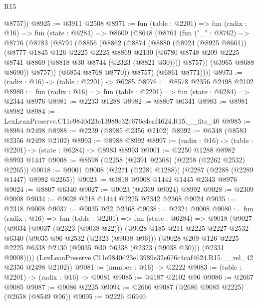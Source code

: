 \begin{lexlean}{R15}
\begin{coremodule}
        @8757))
@8925 := @3911 @2508
@8971 := fun (table : @2201) =>
  fun (radix : @16) =>
  fun (state : @6284) =>
  @8609
    (@8648
      (@8761
        (fun ("_" : @8762) =>
        @8776
          (@8783
            (@8794
              (@8856
                (@8862
                  (@8874
                    (@8880
                      (@8924 (@8925 @8661))
                      (@8777
                        @1845
                        @126
                        @2225
                        @2225
                        @8869
                        @2130
                        (@6780 @8748 @209 @2225 @8741 @8869 (@8818 @30 @8744 (@2323 (@8821 @30))))
                        @8757))
                    (@3965 @8688 @8690))
                  @8757))
              (@6854 @8768 @8770))
            @8757)
          (@6861 @8771))))
@8973 := (radix : @16) -> (table : @2201) -> @6285
@8976 := @8578 @2356 @2498 @2102
@8980 := fun (radix : @16) => fun (table : @2201) => fun (state : @6284) => @2344 @8976
@8981 := @2233 @1288
@8982 := @8807 @6341
@8983 := @8981 @8982
@8984 := LexLeanPreserve.C11e9840d23e13989e32e676c4caf4624.R15.__fits_40
@8985 := @8984 @2498
@8988 := @2239 (@8985 @2356 @2102)
@8992 := @6348 (@8583 @2356 @2498 @2102)
@8993 := @8988 @8992
@8997 := (radix : @16) -> (table : @2201) -> (state : @6284) -> @8983 @8993
@9001 := @2250 @1288 @8982 @8993 @1447
@9008 := @8598 (@2258 (@2391 @2368) (@2258 (@2262 @2532) @2265))
@9018 := @9001 @9008 (@2271 (@2281 @1288)) (@2287 (@2288 (@2289 @1447) @8982 @2265))
@9023 := @3818 @9008 @1442 @1445 @2343 @8976
@9024 := @8807 @6340
@9027 := @9023 (@2369 @9024) @8992
@9028 := @2309 @9008
@9034 := @9028 @218 @1444 @2225 @2342 @2368 @9024
@9035 := @2318 @9008
@9037 := @9035 @22 @2368
@9038 := @2324 @9008
@9080 := fun (radix : @16) =>
  fun (table : @2201) =>
  fun (state : @6284) =>
  @9018
    (@9027
      (@9034
        (@9037 (@2323 (@9038 @22)))
        (@9028
          @185
          @211
          @2225
          @2227
          @2532
          @6340
          (@9035 @96 @2532 (@2323 (@9038 @96)))
          (@9028
            @209
            @126
            @2225
            @2225
            @6338
            @2130
            (@9035 @30 @6338 (@2323 (@9038 @30)))
            (@2331 @9008))))
      (LexLeanPreserve.C11e9840d23e13989e32e676c4caf4624.R15.__rel_42 @2356 @2498 @2102))
@9081 := (number : @16) -> @2222
@9083 := (table : @2201) -> (radix : @16) -> @9081
@9085 := @4187 @2102 @96
@9086 := @2667 @9085
@9087 := @9086 @2225
@9094 := @2666 @9087 (@2686 @9085 @2225) (@2658 (@8549 @96))
@9095 := @2226 @6940

\end{coremodule}
\end{lexlean}
